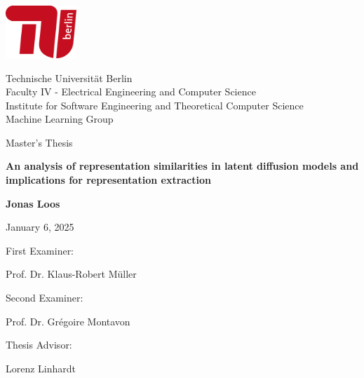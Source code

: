 
\begin{titlepage}
    \centering
    \includegraphics[width=0.2\textwidth]{assets/TU_logo_short.png}\par\vspace{0.2cm}
    {\Large Technische Universität Berlin}\\
    {Faculty IV - Electrical Engineering and Computer Science}\\
    {Institute for Software Engineering and Theoretical Computer Science}\\
    {Machine Learning Group}\\
    \vspace{2cm}

    {\LARGE Master's Thesis}\\
    \vspace{0.5cm}
    
    {\huge\bfseries An analysis of representation similarities in latent diffusion models and implications for representation extraction\par}
    \vspace{1cm}
    
    {\LARGE\bfseries Jonas Loos\par}
    \vspace{1cm}

    {January 6, 2025\par}
    \vspace{1cm}

    {First Examiner:}\\
    {\large Prof. Dr. Klaus-Robert Müller\par}
    \vspace{0.5cm}
    
    {Second Examiner:}\\
    {\large Prof. Dr. Grégoire Montavon\par}
    \vspace{0.5cm}
    
    {Thesis Advisor:}\\
    {\large Lorenz Linhardt\par}
    
\end{titlepage}

